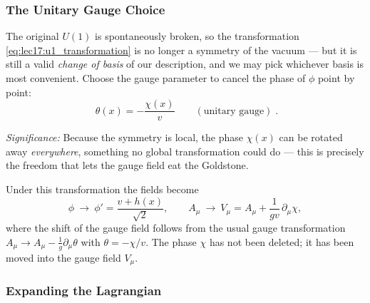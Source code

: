 \subsubsection*{The Unitary Gauge Choice}

The original $U(1)$ is spontaneously broken, so the transformation \eqref{eq:lec17:u1_transformation} is no longer a symmetry of the vacuum --- but it is still a valid \emph{change of basis} of our description, and we may pick whichever basis is most convenient. Choose the gauge parameter to cancel the phase of $\phi$ point by point:
\begin{equation}
  \boxed{\;\theta(x)=-\frac{\chi(x)}{v}\qquad(\text{unitary gauge})\;.}
  \label{eq:lec17:unitary_gauge_choice}
\end{equation}

\textit{Significance:} Because the symmetry is local, the phase $\chi(x)$ can be rotated away \emph{everywhere}, something no global transformation could do --- this is precisely the freedom that lets the gauge field eat the Goldstone.

Under this transformation the fields become
\begin{equation}
  \phi\ \to\ \phi'=\frac{v+h(x)}{\sqrt2},
  \qquad
  A_\mu\ \to\ V_\mu= A_\mu+\frac{1}{gv}\,\partial_\mu\chi ,
  \label{eq:lec17:unitary_fields}
\end{equation}
where the shift of the gauge field follows from the usual gauge transformation $A_\mu\to A_\mu-\tfrac1g\partial_\mu\theta$ with $\theta=-\chi/v$. The phase $\chi$ has not been deleted; it has been moved into the gauge field $V_\mu$.

\subsubsection*{Expanding the Lagrangian}

